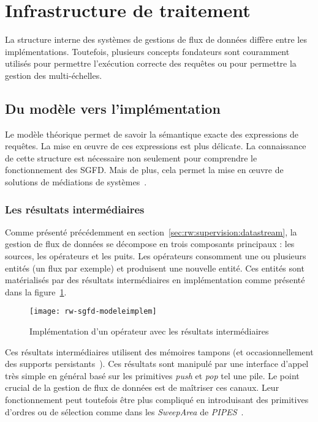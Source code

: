 \section{Infrastructure de traitement}\label{sec:rw:sgfd:infra}
La structure interne des systèmes de gestions de flux de données diffère entre les implémentations. Toutefois, plusieurs concepts fondateurs sont couramment utilisés pour permettre l'exécution correcte des requêtes ou pour permettre la gestion des multi-échelles.
\subsection{Du modèle vers l'implémentation}
Le modèle théorique permet de savoir la sémantique exacte des expressions de requêtes. La mise en œuvre de ces expressions est plus délicate. La connaissance de cette structure est nécessaire non seulement pour comprendre le fonctionnement des SGFD. Mais de plus, cela permet la mise en œuvre de solutions de médiations de systèmes~\cite{Tatbul:integration}.

\subsubsection{Les résultats intermédiaires}
Comme présenté précédemment en section~\ref{sec:rw:supervision:datastream}, la gestion de flux de données se décompose en trois composants principaux : les sources, les opérateurs et les puits. Les opérateurs consomment une ou plusieurs entités (un flux par exemple) et produisent une nouvelle entité. Ces entités sont matérialisés par des résultats intermédiaires en implémentation comme présenté dans la figure~\ref{fig:rw:sgfd:modeleimplem}.
\begin{figure}[ht]
    \centering
    \texttt{[image: rw-sgfd-modeleimplem]}
    \caption{Implémentation d'un opérateur avec les résultats intermédiaires}\label{fig:rw:sgfd:modeleimplem}
\end{figure}

Ces résultats intermédiaires utilisent des mémoires tampons (et occasionnellement des supports persistants~\cite{Abadi:aurora}). Ces résultats sont manipulé par une interface d'appel très simple en général basé sur les primitives \textit{push} et \textit{pop} tel une pile. Le point crucial de la gestion de flux de données est de maîtriser ces canaux. Leur fonctionnement peut toutefois être plus compliqué en introduisant des primitives d'ordres ou de sélection comme dans les \textit{SweepArea} de \textit{PIPES}~\cite{Kramer:semantics}.

